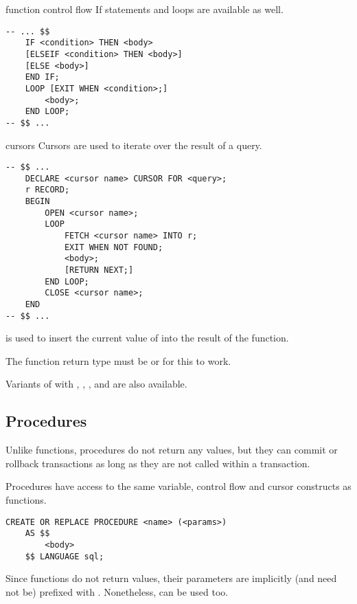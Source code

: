 \begin{defn}{function control flow}
    If statements and loops are available as well.

    \begin{lstlisting}
-- ... $$
    IF <condition> THEN <body>
    [ELSEIF <condition> THEN <body>]
    [ELSE <body>]
    END IF;
    LOOP [EXIT WHEN <condition>;]
        <body>;
    END LOOP;
-- $$ ...
\end{lstlisting}
\end{defn}

\begin{defn}{cursors}
    Cursors are used to iterate over the result of a query.
    \begin{lstlisting}
-- $$ ...
    DECLARE <cursor name> CURSOR FOR <query>;
    r RECORD;
    BEGIN
        OPEN <cursor name>;
        LOOP
            FETCH <cursor name> INTO r;
            EXIT WHEN NOT FOUND;
            <body>;
            [RETURN NEXT;]
        END LOOP;
        CLOSE <cursor name>;
    END
-- $$ ...
\end{lstlisting}

     is used to insert the current value of  into the result of the function.

    The function return type must be  or  for this to work.

    Variants of  with , , ,  and  are also available.
\end{defn}

\subsection{Procedures}
Unlike functions, procedures do not return any values, but they can commit or rollback transactions as long as they are not called within a transaction.

Procedures have access to the same variable, control flow and cursor constructs as functions.

\begin{lstlisting}
CREATE OR REPLACE PROCEDURE <name> (<params>)
    AS $$
        <body>
    $$ LANGUAGE sql;
\end{lstlisting}

Since functions do not return values, their parameters are implicitly (and need not be) prefixed with . Nonetheless,  can be used too.

